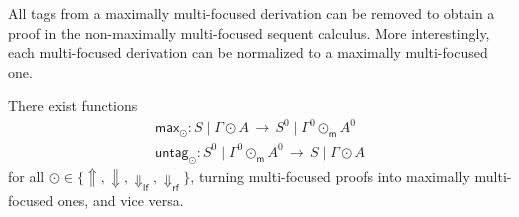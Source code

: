 \documentclass[runningheads]{llncs}
\newcommand{\lfm}{\dn_\mathsf{lfm}}%
\newcommand{\rfm}{\dn_\mathsf{rfm}}%
\newcommand{\lf}{\dn_\mathsf{lf}}%
\newcommand{\rf}{\dn_\mathsf{rf}}%
\newcommand{\green}[1]{{#1^0}}
\newcommand{\up}{\Uparrow}
\newcommand{\dn}{\Downarrow}
\newcommand{\upm}{\Uparrow_{\mathsf{m}}}
\newcommand{\dnm}{\Downarrow_{\mathsf{m}}}
\newcommand{\Prf}{\mathsf{Prf}}
\begin{document}
All tags from a maximally multi-focused derivation can be removed to obtain a proof in the non-maximally multi-focused sequent calculus. 
More interestingly, each multi-focused derivation can be normalized to a maximally multi-focused one. %
\begin{theorem}\label{thm2}
  There exist functions
  \[
  \begin{array}{l}%
    \mathsf{max}_\odot : S \mid \Gamma \odot A \, \to \, \green{S} \mid \green{\Gamma} \odot_\mathsf{m} \green{A} \\
    \mathsf{untag}_\odot : \green{S} \mid \green{\Gamma} \odot_{\mathsf{m}} \green{A} \, \to \, S \mid \Gamma \odot A %
  \end{array}
  \]
 for all $\odot \in \{\up,\dn,\lf,\rf \}$, turning multi-focused proofs into maximally multi-focused ones, and vice versa.
\end{theorem}
\end{document}

